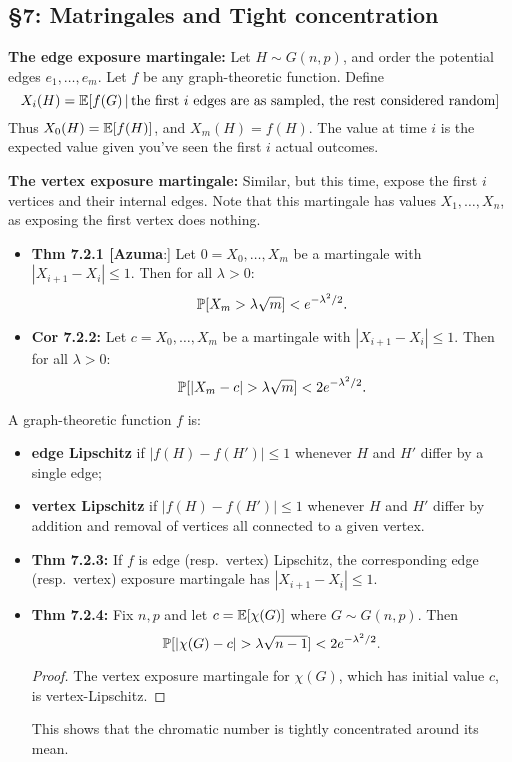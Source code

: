 \documentclass[11pt]{article}
\newenvironment{INT}[1][]{\begin{itemize}\small\item\textbf{#1}}{\end{itemize}}
\newcommand{\moreINT}[1][]{\item\textbf{#1}}
\begin{document}
\begin{chapter7}
\section*{\S7: Matringales and Tight concentration}
\begin{itemise}
\item \textbf{The edge exposure martingale:} Let $H\sim G(n,p)$, and order the potential edges $e_1,\ldots,e_m$. Let $f$ be any graph-theoretic function. Define
\[X_i(H)=\operatorname{\mathbb{E}}[f(G)\,|\,\textup{the first $i$ edges are as sampled, the rest considered random}]\]
Thus $X_0(H)=\operatorname{\mathbb{E}}[f(H)]$, and $X_m(H)=f(H)$. The value at time $i$ is the expected value given you've seen the first $i$ actual outcomes.
\item \textbf{The vertex exposure martingale:} Similar, but this time, expose the first $i$ vertices and their internal edges. Note that this martingale has values $X_1,\ldots,X_n$, as exposing the first vertex does nothing.
\begin{INT}[Thm 7.2.1 [Azuma]:]
Let $0=X_0,\ldots,X_m$ be a martingale with $|X_{i+1}-X_i|\leq1$. Then for all $\lambda>0$:
\[\operatorname{\mathbb{P}}[X_m>\lambda\sqrt m]<e^{-\lambda^2/2}.\]
\moreINT[Cor 7.2.2:]
Let $c=X_0,\ldots,X_m$ be a martingale with $|X_{i+1}-X_i|\leq1$. Then for all $\lambda>0$:
\[\Prob[|X_m-c|>\lambda\sqrt m]<2e^{-\lambda^2/2}.\]
\end{INT}
\item A graph-theoretic function $f$ is:
\begin{itemize}\squishlist
\item  \textbf{edge Lipschitz} if $|f(H)-f(H')|\leq1$ whenever $H$ and $H'$ differ by a single edge;
\item  \textbf{vertex Lipschitz} if $|f(H)-f(H')|\leq1$ whenever $H$ and $H'$ differ by addition and removal of vertices all connected to a given vertex.
\end{itemize}
\begin{INT}[Thm 7.2.3:]
If $f$ is edge (resp.\ vertex) Lipschitz, the corresponding edge (resp.\ vertex) exposure martingale has $|X_{i+1}-X_i|\leq1$.
\moreINT[Thm 7.2.4:]
Fix $n,p$ and let $c=\operatorname{\mathbb{E}}[\chi(G)]$ where $G\sim G(n,p)$. Then
\[\Prob[|\chi(G)-c|>\lambda\sqrt{n-1}]<2e^{-\lambda^2/2}.\]
\begin{proof}
The vertex exposure martingale for $\chi(G)$, which has initial value $c$, is vertex-Lipschitz.
\end{proof}
This shows that the chromatic number is tightly concentrated around its mean.

\end{INT}
\end{itemise}
\end{chapter7}
\end{document}

